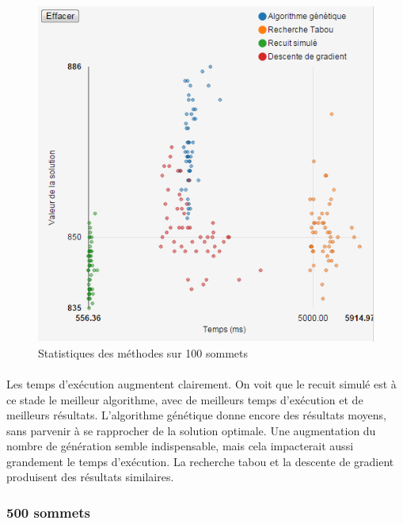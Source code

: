 \documentclass[12pt]{article}
\begin{document}
\begin{figure}[H]
	\begin{center}
	\includegraphics[scale=0.5]{pictures/results/100sommets.png}
	\end{center}
	\caption{Statistiques des méthodes sur 100 sommets \label{fig:100nodeResult}}
\end{figure}
\paragraph{}Les temps d'exécution augmentent clairement. On voit que le recuit simulé est à ce stade le meilleur algorithme, avec de meilleurs temps d'exécution et de meilleurs résultats. L'algorithme génétique donne encore des résultats moyens, sans parvenir à se rapprocher de la solution optimale. Une augmentation du nombre de génération semble indispensable, mais cela impacterait aussi grandement le temps d'exécution. La recherche tabou et la descente de gradient produisent des résultats similaires.

\subsubsection{500 sommets}
\end{document}
